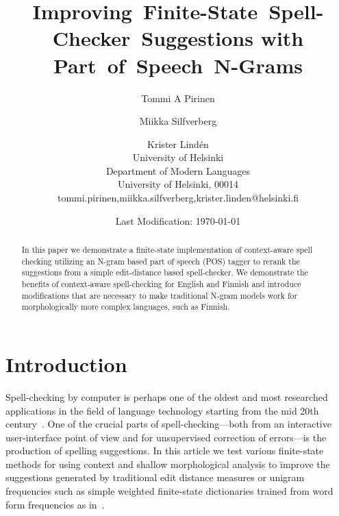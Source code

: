 \documentclass[postprint]{flammie}
\begin{document}
\title{Improving~Finite-State~Spell-Checker~Suggestions with 
Part~of~Speech~N-Grams}

\author{Tommi A Pirinen \and Miikka Silfverberg \and Krister Lind\'{e}n\\
University of Helsinki\\
Department of Modern Languages\\
University of Helsinki, 00014\\
tommi.pirinen,miikka.silfverberg,krister.linden@helsinki.fi}

\date{Last Modification: \today}

\maketitle

\begin{abstract} 
In this paper we demonstrate a finite-state implementation of
context-aware spell checking utilizing an N-gram based part of speech (POS)
tagger to rerank the suggestions from a simple edit-distance based
spell-checker. We demonstrate the benefits of context-aware spell-checking for
English and Finnish and introduce modifications that are necessary to make
traditional N-gram models work for morphologically more complex languages, such
as Finnish.
\end{abstract}

\section{Introduction}

Spell-checking by computer is perhaps one of the oldest and most researched
applications in the field of language technology starting from the mid 20th
century~\cite{damerau/1964}. One of the crucial parts of spell-checking---both
from an interactive user-interface point of view and for unsupervised correction
of errors---is the production of spelling suggestions.  In this article we test
various finite-state methods for using context and shallow morphological
analysis to improve the suggestions generated by traditional edit distance
measures or unigram frequencies such as simple weighted
finite-state dictionaries trained from word form frequencies as 
in~\cite{pirinen/2010/lrec}.
\end{document}
